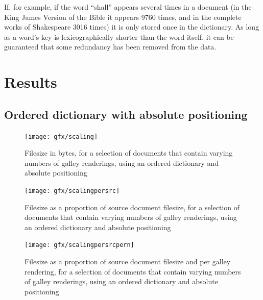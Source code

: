 If, for example, if the word ``shall'' appears several times in a document (in the King James Version of the Bible it appears 9760 times, and in the complete works of Shakespeare 3016 times) it is only stored once in the dictionary. As long as a word's key is lexicographically shorter than the word itself, it can be guaranteed that some redundancy has been removed from the data.


\section{Results}

\subsection{Ordered dictionary with absolute positioning}

\begin{figure}
  \begin{center}
  \texttt{[image: gfx/scaling]}
  \end{center}
  \caption[Filesize versus number of renderings, using absolute positioning]{Filesize in bytes, for a selection of documents that contain varying numbers of galley renderings, using an ordered dictionary and absolute positioning}
  \label{fig:sizescale}
\end{figure}

\begin{figure}
  \begin{center}
  \texttt{[image: gfx/scalingpersrc]}
  \end{center}
  \caption[Filesize as a proportion of source document size, versus number of renderings, using absolute positioning]{Filesize as a proportion of source document filesize, for a selection of documents that contain varying numbers of galley renderings, using an ordered dictionary and absolute positioning}
  \label{fig:sizescalepersrc}
\end{figure}

\begin{figure}
  \begin{center}
  \texttt{[image: gfx/scalingpersrcpern]}
  \end{center}
  \caption[Filesize as a proportion of source document size, per rendering, versus number of renderings, using absolute positioning]{Filesize as a proportion of source document filesize and per galley rendering, for a selection of documents that contain varying numbers of galley renderings, using an ordered dictionary and absolute positioning}
  \label{fig:sizescalepersrcpern}
\end{figure}


